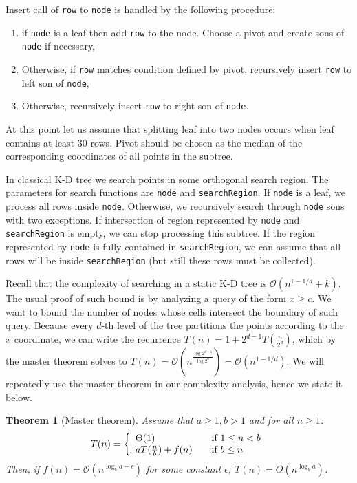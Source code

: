 \documentclass[10pt,a4paper]{article}
\newtheorem{theorem}{Theorem}
\newcommand{\Oh}{\mathcal{O}}
\begin{document}
Insert call of \verb|row| to \verb|node| is handled by the following procedure:

\begin{enumerate}
\item if \verb|node| is a leaf then add \verb|row| to the node. Choose a pivot and create sons of \verb|node| if necessary,
\item Otherwise, if \verb|row| matches condition defined by pivot, recursively insert \verb|row| to left son of \verb|node|,
\item Otherwise, recursively insert \verb|row| to right son of \verb|node|.
\end{enumerate}

At this point let us assume that splitting leaf into two nodes occurs when leaf contains at least 30 rows. Pivot should be chosen as the median of the corresponding coordinates of all points in the subtree.

In classical K-D tree we search points in some orthogonal search region. The parameters for search functions are \verb|node| and \verb|searchRegion|. If \verb|node| is a leaf, we process all rows inside \verb|node|. Otherwise, we recursively search through \verb|node| sons with two exceptions. If intersection of region represented by \verb|node| and \verb|searchRegion| is empty, we can stop processing this subtree. If the region represented by \verb|node| is fully contained in \verb|searchRegion|, we can assume that all rows will be inside \verb|searchRegion| (but still these rows must be collected).

Recall that the complexity of searching in a static K-D tree is $\Oh(n^{1-1/d} + k)$. The usual proof of such bound is by analyzing a query of the form $x \geq c$. We want to bound the number of nodes whose cells intersect the boundary of such query. Because every $d$-th level of the tree partitions the points according to the $x$ coordinate, we can write the recurrence $T(n)=1+2^{d-1}T(\frac{n}{2^{d}})$, which by the master theorem solves to $T(n)=\Oh(n^{\frac{\log 2^{d-1}}{\log 2^{d}}})=\Oh(n^{1-1/d})$. We will repeatedly use the master theorem in our complexity analysis, hence we state it below.

\begin{theorem}[Master theorem]
Assume that $a \geq 1, b > 1$ and for all $n\geq 1$:
\[
  T(n) = \left\{ 
  \begin{array}{l l}
    \Theta(1) & \quad \text{if $1 \leq n < b$}\\
    a T(\frac{n}{b}) + f(n) & \quad \text{if $b \leq n$ }\\
  \end{array} \right.
\]
Then, if $f(n)=\Oh(n^{{\log_{b}{a}} - \epsilon})$ for some constant $\epsilon$, $T(n) = \Theta(n^{\log_{b}{a}})$.
\end{theorem}
\end{document}

